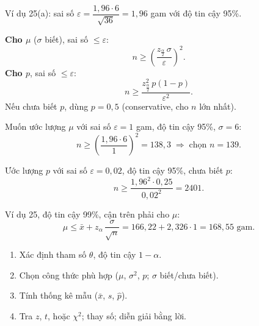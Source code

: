 \documentclass[12pt,a4paper]{article}
\begin{document}
\begin{vidu}[title={Sai số}]
Ví dụ 25(a): sai số $\varepsilon = \dfrac{1{,}96 \cdot 6}{\sqrt{36}} = 1{,}96$ gam với độ tin cậy 95\%.
\end{vidu}

\begin{congthuc}[title={Cỡ mẫu cần thiết}]
  \textbf{Cho $\mu$} ($\sigma$ biết), sai số $\le \varepsilon$:
  \[
    n \ge \left(\dfrac{z_{\frac{\alpha}{2}}\,\sigma}{\varepsilon}\right)^2.
  \]
  \textbf{Cho $p$}, sai số $\le \varepsilon$:
  \[
    n \ge \dfrac{z_{\frac{\alpha}{2}}^2\,p(1-p)}{\varepsilon^2}.
  \]
  Nếu chưa biết $p$, dùng $p = 0{,}5$ (conservative, cho $n$ lớn nhất).
\end{congthuc}

\begin{vidu}[title={Cỡ mẫu cho}]
Muốn ước lượng $\mu$ với sai số $\varepsilon = 1$ gam, độ tin cậy 95\%, $\sigma = 6$:
\[
  n \ge \left(\dfrac{1{,}96 \cdot 6}{1}\right)^2 = 138{,}3 \;\Rightarrow\; \text{chọn } n = 139.
\]
\end{vidu}

\begin{vidu}[title={Cỡ mẫu cho tỷ lệ}]
Ước lượng $p$ với sai số $\varepsilon = 0{,}02$, độ tin cậy 95\%, chưa biết $p$:
\[
  n \ge \dfrac{1{,}96^2 \cdot 0{,}25}{0{,}02^2} = 2401.
\]
\end{vidu}

\begin{vidu}[title={Cận trên một phía}]
Ví dụ 25, độ tin cậy 99\%, cận trên phải cho $\mu$:
\[
  \mu \le \bar{x} + z_{\alpha}\,\dfrac{\sigma}{\sqrt{n}} = 166{,}22 + 2{,}326 \cdot 1 = 168{,}55 \text{ gam}.
\]
\end{vidu}

\begin{phuongphap}[title={Quy trình lập KTC}]
\begin{enumerate}
  \item Xác định tham số $\theta$, độ tin cậy $1-\alpha$.
  \item Chọn công thức phù hợp ($\mu$, $\sigma^2$, $p$; $\sigma$ biết/chưa biết).
  \item Tính thống kê mẫu ($\bar{x}$, $s$, $\hat{p}$).
  \item Tra $z$, $t$, hoặc $\chi^2$; thay số; diễn giải bằng lời.
\end{enumerate}
\end{phuongphap}
\end{document}
